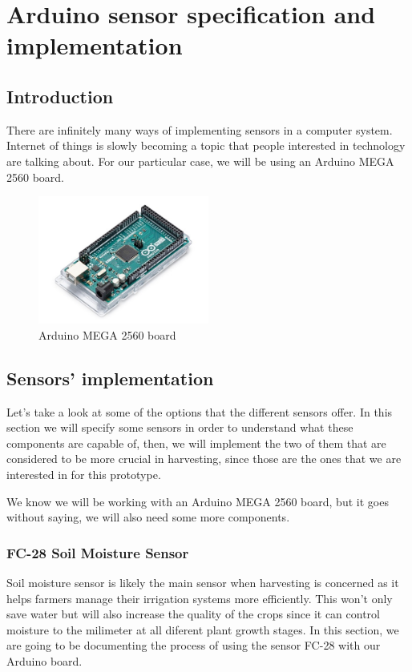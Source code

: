 \chapter{Arduino sensor specification and implementation}\label{cap:implementacion}

\section{Introduction}
There are infinitely many ways of implementing sensors in a computer system. Internet of things is slowly becoming a topic that people interested in technology are talking about. For our particular case, we will be using an Arduino MEGA 2560 board.

\begin{figure}[H]
    \centering
    \includegraphics[width=0.5\textwidth]{fig/mega2560.jpg}
    \caption{Arduino MEGA 2560 board}
    \label{fig:mega2560}
\end{figure}



\section{Sensors' implementation}
Let's take a look at some of the options that the different sensors offer. In this section we will specify some sensors in order to understand what these components are capable of, then, we will implement the two of them that are considered to be more crucial in harvesting, since those are the ones that we are interested in for this prototype. 

We know we will be working with an Arduino MEGA 2560 board, but it goes without saying, we will also need some more components. 

\subsection{FC-28 Soil Moisture Sensor}
Soil moisture sensor is likely the main sensor when harvesting is concerned as it helps farmers manage their irrigation systems more efficiently. This won't only save water but will also increase the quality of the crops since it can control moisture to the milimeter at all diferent plant growth stages. In this section, we are going to be documenting the process of using the sensor FC-28 with our Arduino board.

